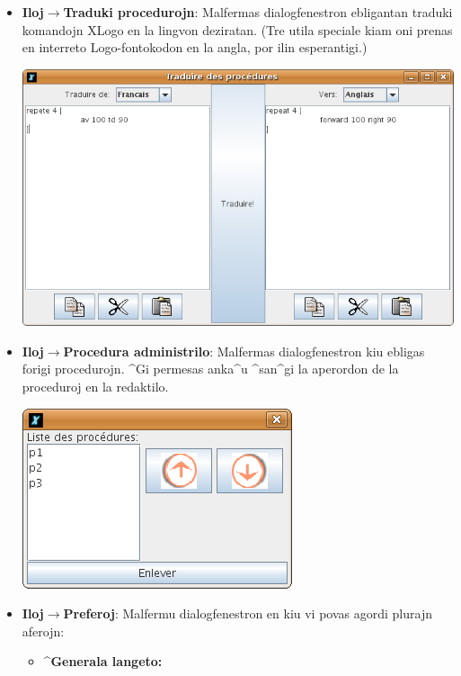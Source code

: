\begin{itemize}
\begin{center}
  \end{center}
  \vspace{0.25cm}
\item \textbf{Iloj$\to$Traduki procedurojn}: Malfermas dialogfenestron
  ebligantan traduki komandojn XLogo en la lingvon deziratan.  (Tre
  utila speciale kiam oni prenas en interreto Logo-fontokodon en la
  angla, por ilin esperantigi.)
\begin{center}
 \includegraphics[scale=0.4]{bildoj/CaptureTraduire.png}
\end{center}
\vspace{0.25cm}
\item \textbf{Iloj$\to$Procedura administrilo}: Malfermas
  dialogfenestron kiu ebligas forigi procedurojn.  ^Gi permesas anka^u
  ^san^gi la aperordon de la proceduroj en la redaktilo.
\begin{center}
 \includegraphics[scale=0.4]{bildoj/CaptureProcedure.png}
\end{center}
\vspace{0.25cm}
\item \textbf{Iloj$\to$Preferoj}: Malfermu dialogfenestron en kiu vi
  povas agordi plurajn aferojn:
  \begin{itemize} 
  \item \textbf{^Generala langeto:} \label{onglet_general}

\end{itemize}
\end{itemize}

